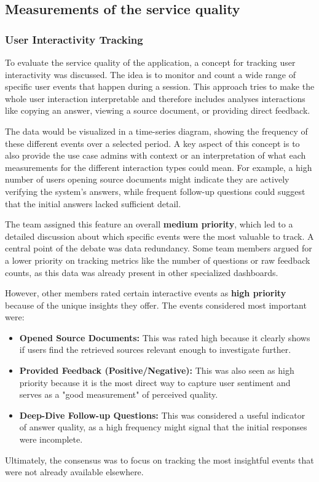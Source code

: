 \documentclass[
	english,
	ruledheaders=section,%
	class=report,%
	thesis={type=bachelor},%
	accentcolor=1b,%
	custommargins=true,%
	marginpar=false,%
	parskip=half-,%
	fontsize=11pt,%
	DIV=14,
]{tudapub}
\begin{document}
\subsection{Measurements of the service quality}
\subsubsection{User Interactivity Tracking}
To evaluate the service quality of the application, a concept for tracking user interactivity was discussed. The idea is to monitor and count a wide range of specific user events that happen during a session. This approach tries to make the whole user interaction interpretable and therefore includes analyses interactions like copying an answer, viewing a source document, or providing direct feedback.

The data would be visualized in a time-series diagram, showing the frequency of these different events over a selected period. A key aspect of this concept is to also provide the use case admins with context or an interpretation of what each measurements for the different interaction types could mean. For example, a high number of users opening source documents might indicate they are actively verifying the system's answers, while frequent follow-up questions could suggest that the initial answers lacked sufficient detail.

The team assigned this feature an overall \textbf{medium priority}, which led to a detailed discussion about which specific events were the most valuable to track. A central point of the debate was data redundancy. Some team members argued for a lower priority on tracking metrics like the number of questions or raw feedback counts, as this data was already present in other specialized dashboards.

However, other members rated certain interactive events as \textbf{high priority} because of the unique insights they offer. The events considered most important were:
\begin{itemize}
    \item \textbf{Opened Source Documents:} This was rated high because it clearly shows if users find the retrieved sources relevant enough to investigate further.
    \item \textbf{Provided Feedback (Positive/Negative):} This was also seen as high priority because it is the most direct way to capture user sentiment and serves as a "good measurement" of perceived quality.
    \item \textbf{Deep-Dive Follow-up Questions:} This was considered a useful indicator of answer quality, as a high frequency might signal that the initial responses were incomplete.
\end{itemize}
Ultimately, the consensus was to focus on tracking the most insightful events that were not already available elsewhere.
\end{document}
